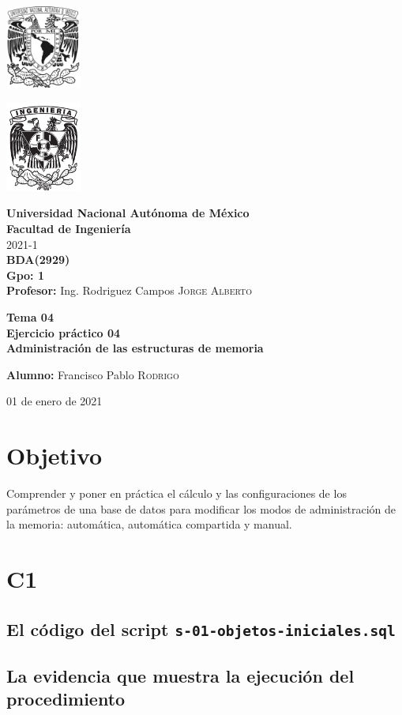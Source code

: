 \documentclass{article}
\newcommand{\coverPage}{
\thispagestyle{empty}
  \begin{minipage}[t][5cm][t]{0.2\linewidth}
    \includegraphics[width=2.5cm]{unam.jpg}

    \vspace{10cm}

    \includegraphics[width=2.5cm]{fiblack}
  \end{minipage}
  \begin{minipage}[t]{0.7\linewidth}
    \vspace{-2.5cm}
    \LARGE{\textbf{\university}}\\
    \Large{\textbf{\faculty}} \\
  
    \large{\semestre}\\[2cm]
  
    \large{\textbf{\materia (\clave)}}\\
    \large{\textbf{Gpo: \grupo}}\\[5mm]
    \large{\textbf{Profesor:} \profesor}\\ [1.5cm]
    \begin{center}
        \LARGE{\textbf{\actividad}}\\
        \LARGE{\textbf{\titulo}}\\
    \end{center}
  
    \vspace{3.3cm}
  
    \large{\textbf{Alumno:} \alumno} \\[1.5cm]
  
    \begin{flushright}
        \fechaEntrega%
    \end{flushright}
  \end{minipage}

\newpage
}
\begin{document}

\newcommand{\university}{Universidad Nacional Autónoma de México}
\newcommand{\faculty}{Facultad de Ingeniería}
\newcommand{\semestre}{2021-1}
\newcommand{\materia}{BDA}
\newcommand{\clave}{2929}
\newcommand{\grupo}{1}
\newcommand{\profesor}{Ing. Rodriguez Campos \textsc{Jorge Alberto}}

\newcommand{\alumno}{Francisco Pablo \textsc{Rodrigo}}
\newcommand{\actividad}{Tema 04 \\ Ejercicio práctico 04}
\newcommand{\titulo}{Administración de las estructuras de memoria}

\newcommand{\fechaEntrega}{01 de enero de 2021}

\newcommand{\codedir}{tema04-ej-prac-04-codigo}
\graphicspath{{assets/}{tema04-ej-prac-04.assets/}}

\coverPage%



\section*{Objetivo}

Comprender y poner en práctica el cálculo y las configuraciones de los
parámetros de una base de datos para modificar los modos de administración de la
memoria: automática, automática compartida y manual.

\section*{C1}

\subsection*{El código del script \texttt{s-01-objetos-iniciales.sql}}



\subsection*{La evidencia que muestra la ejecución del procedimiento}
\end{document}
